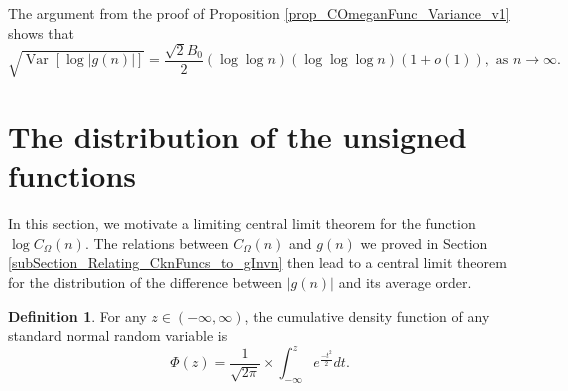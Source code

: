 \documentclass[11pt,reqno,a4letter]{article}
\newcommand{\hlocalref}[1]{\hyperref[#1]{\ref{#1}}}
\numberwithin{equation}{section}
\numberwithin{figure}{section}
\numberwithin{table}{section}
\theoremstyle{plain}
\numberwithin{theorem}{section}
\theoremstyle{definition}
\newtheorem{definition}[theorem]{Definition}
\begin{document}
The argument from the proof of 
Proposition \hlocalref{prop_COmeganFunc_Variance_v1} shows that 
\[
\sqrt{\operatorname{Var}\left[\log |g(n)|\right]}= 
     \frac{\sqrt{2} B_0}{2} (\log\log n) (\log\log\log n) (1+o(1)), 
     \text{ as } n \rightarrow \infty. 
\]

\section{The distribution of the unsigned functions} 
\label{subSection_ErdosKacTheorem_Analogs} 

In this section, we motivate a limiting 
central limit theorem for the function $\log C_{\Omega}(n)$. 
The relations between $C_{\Omega}(n)$ and $g(n)$ we proved in 
Section \hlocalref{subSection_Relating_CknFuncs_to_gInvn} 
then lead to a central limit theorem for the distribution of 
the difference between $|g(n)|$ and its average order. 

\begin{definition}
For any $z \in (-\infty, \infty)$, 
the cumulative density function of any standard normal random variable is 
$$\Phi(z) = \frac{1}{\sqrt{2\pi}} \times \int_{-\infty}^{z} e^{\frac{-t^2}{2}} dt.$$ 
\end{definition}
\end{document}
